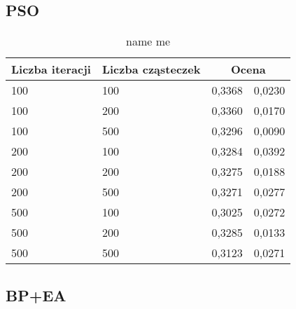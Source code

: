 \documentclass[11pt,a4paper,oneside]{report}
\begin{document}
\subsection{PSO}

\begin{center}
	\begin{longtable}{|l|l|r@{$\pm$}r|}
		\caption{name me}\\
		\hline
		Liczba iteracji & Liczba cząsteczek & \multicolumn{2}{|c|}{Ocena}\\ \hline \hline\endhead
		100 & 100 & 0,3368 & 0,0230\\ \hline
		100 & 200 & 0,3360 & 0,0170\\ \hline
		100 & 500 & 0,3296 & 0,0090\\ \hline
		200 & 100 & 0,3284 & 0,0392\\ \hline
		200 & 200 & 0,3275 & 0,0188\\ \hline
		200 & 500 & 0,3271 & 0,0277\\ \hline
		500 & 100 & 0,3025 & 0,0272\\ \hline
		500 & 200 & 0,3285 & 0,0133\\ \hline
		500 & 500 & 0,3123 & 0,0271\\ \hline
	\end{longtable}
\end{center}

\subsection{BP+EA}
\end{document}
